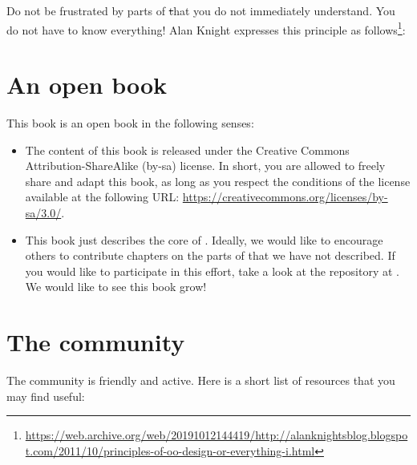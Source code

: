 \documentclass[a4paper,10pt,twoside]{book}
\begin{document}
Do not be frustrated by parts of \st that you do not immediately understand.
You do not have to know everything!
Alan Knight expresses this principle as follows\footnote{\url{https://web.archive.org/web/20191012144419/http://alanknightsblog.blogspot.com/2011/10/principles-of-oo-design-or-everything-i.html}}:

\section*{An open book}

This book is an open book in the following senses:

\begin{itemize}

\item	The content of this book is released under the Creative Commons Attribution-ShareAlike (by-sa) license.
		In short, you are allowed to freely share and adapt this book, as long as you respect the conditions of the license available at the following URL:
		\url{https://creativecommons.org/licenses/by-sa/3.0/}.

\item	This book just describes the core of \sq.
		Ideally, we would like to encourage others to contribute chapters on the parts of \sq that we have not described.
		If you would like to participate in this effort, take a look at the repository at \sbeRepoUrl.
		We would like to see this book grow!
\end{itemize}

\section*{The \sq community}

The \sq community is friendly and active.
Here is a short list of resources that you may find useful:
\end{document}
